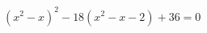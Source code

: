 \begin{ex}[type=equation]
	\begin{condition}
		\( (x^2-x)^2-18(x^2-x-2)+36=0 \)
	\end{condition}
\end{ex}